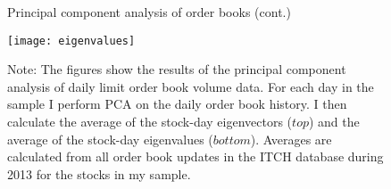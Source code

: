 \begin{figure}[p]
\linespread{1}
\centering
\captionsetup{labelsep=colon, font=footnotesize, justification=centerfirst, width=\linewidth}
\caption{Principal component analysis of order books (cont.)}
\texttt{[image: eigenvalues]}
\captionsetup{font=footnotesize, justification=justified, width=\linewidth}
\caption*{Note: The figures show the results of the principal component analysis of daily limit order book volume data. For each day in the sample I perform PCA on the daily order book history. I then calculate the average of the stock-day eigenvectors ($top$) and the average of the stock-day eigenvalues ($bottom$). Averages are calculated from all order book updates in the ITCH database during 2013 for the stocks in my sample.}
\end{figure}
